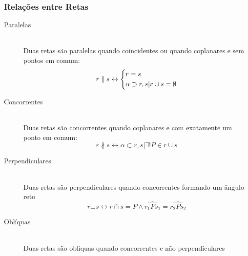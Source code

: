     \subsubsection{Relações entre Retas}
        \begin{description}
            \item[Paralelas] \hfill \\
                Duas retas são paralelas quando coincidentes ou quando coplanares e sem pontos em comum:
                \[ r \parallel s \leftrightarrow \begin{dcases} r = s \\ \alpha \supset r,s | r \cup s = \emptyset \end{dcases} \]
            \item[Concorrentes] \hfill \\
                Duas retas são concorrentes quando coplanares e com exatamente um ponto em comum:
                \[ r \nparallel s \leftrightarrow \alpha \subset r, s | \exists!P \in r \cup s \]
            \item[Perpendiculares] \hfill \\
                Duas retas são perpendiculares quando concorrentes formando um ângulo reto
                \[ r \bot s \leftrightarrow r \cap s = P \wedge \hat{r_1Ps_1} = \hat{r_2Ps_2} \]
            \item[Oblíquas] \hfill \\
                Duas retas são oblíquas quando concorrentes e não perpendiculares
        \end{description}
